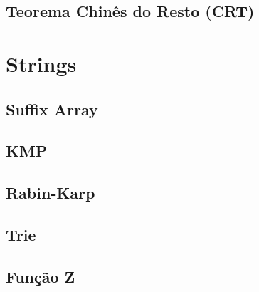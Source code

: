 % 

\subsection{Teorema Chinês do Resto (CRT)}


\section{Strings}

\subsection{Suffix Array}


\subsection{KMP}


% 

% 

\subsection{Rabin-Karp}


\subsection{Trie}


\subsection{Função Z}


